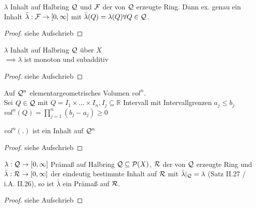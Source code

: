 \documentclass[11pt,a4paper,fleqn,openany]{report}
\begin{document}
    \begin{theorem}[i.A. II.26]
      $\lambda$ Inhalt auf Halbring $\mathcal{Q}$ und $\mathcal{F}$ der von $\mathcal{Q}$ erzeugte Ring. Dann ex. genau ein Inhalt $\bar{\lambda}:\mathcal{F} \to [0, \infty]$ mit $\bar{\lambda}(Q)=\lambda(Q) \forall Q \in \mathcal{Q}$.
    \end{theorem}

    \begin{proof}
      siehe Aufschrieb
    \end{proof}

    \begin{lemma}[i.A. II.27]
      $\lambda$ Inhalt auf Halbring $\mathcal{Q}$ über $X$\\
      $\implies \lambda$ ist monoton und subadditiv
    \end{lemma}

    \begin{proof}
      siehe Aufschrieb
    \end{proof}

    \begin{example}
      Auf $\mathcal{Q}^n$ elementargeometrisches Volumen $vol^n$.\\
      Sei $Q \in \mathcal{Q}$ mit $Q = I_1 \times ... \times I_n, I_j \subseteq \mathbb{R}$ Intervall mit Intervallgrenzen $a_j \leq b_j$\\
      $vol^n(Q) = \prod\limits_{j=1}^n (b_j - a_j) \geq 0$
    \end{example}

    \begin{theorem}[i.A. II.28]
      $vol^n(.)$ ist ein Inhalt auf $\mathcal{Q}^n$
    \end{theorem}

    \begin{proof}
      siehe Aufschrieb
    \end{proof}

    \begin{theorem}[i.A. II.29]
      $\lambda: \mathcal{Q} \to [0, \infty]$ Prämaß auf Halbring $\mathcal{Q} \subseteq \mathcal{P}(X)$, $\mathcal{R}$ der von $\mathcal{Q}$ erzeugte Ring und $\bar{\lambda}: \mathcal{R} \to [0,\infty]$ der eindeutig bestimmte Inhalt auf $\mathcal{R}$ mit $\bar{\lambda}|_{\mathcal{Q}}=\lambda$ (Satz II.27 / i.A. II.26), so ist $\bar{\lambda}$ ein Prämaß auf $\mathcal{R}$.
    \end{theorem}

    \begin{proof}
      siehe Aufschrieb
    \end{proof}
\end{document}
